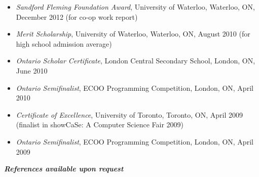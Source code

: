 \documentclass[10pt,letterpaper]{article}
\begin{document}
\begin{adjustwidth}{0.1in}{0.5in}
    \begin{itemize}
	\item \emph{Sandford Fleming Foundation Award}, University of Waterloo, Waterloo, ON, December 2012 
	    (for co-op work report)
	\item \emph{Merit Scholarship}, University of Waterloo, Waterloo, ON, August 2010 
	    (for high school admission average)
	\item \emph{Ontario Scholar Certificate}, London Central Secondary School, London, ON, June 2010
	\item \emph{Ontario Semifinalist}, ECOO Programming Competition, London, ON, April 2010
	\item \emph{Certificate of Excellence}, University of Toronto, Toronto, ON, April 2009 
	    (finalist in showCaSe: A Computer Science Fair 2009)
	\item \emph{Ontario Semifinalist}, ECOO Programming Competition, London, ON, April 2009
    \end{itemize}
\end{adjustwidth}
\vspace{1em}
\begin{center}
	\textbf{\textit{References available upon request}}
\end{center}
\end{document}
